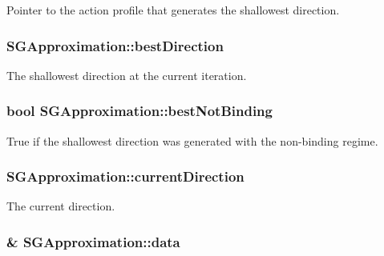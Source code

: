 Pointer to the action profile that generates the shallowest direction. \hypertarget{classSGApproximation_a1dd4f78e0789e61ee5c467afc403fc6d}{
\subsubsection[{best\-Direction}]{ S\-G\-Approximation\-::best\-Direction\hspace{0.3cm}{\ttfamily [private]}}}\label{classSGApproximation_a1dd4f78e0789e61ee5c467afc403fc6d}
The shallowest direction at the current iteration. \hypertarget{classSGApproximation_a3f55b0a9fb9f8e2c3ae6949bc8fd046c}{
\subsubsection[{best\-Not\-Binding}]{\setlength{\rightskip}{0pt plus 5cm}bool S\-G\-Approximation\-::best\-Not\-Binding\hspace{0.3cm}{\ttfamily [private]}}}\label{classSGApproximation_a3f55b0a9fb9f8e2c3ae6949bc8fd046c}
True if the shallowest direction was generated with the non-\/binding regime. \hypertarget{classSGApproximation_a603408048cb6c1a13078c27a017e8202}{
\subsubsection[{current\-Direction}]{ S\-G\-Approximation\-::current\-Direction\hspace{0.3cm}{\ttfamily [private]}}}\label{classSGApproximation_a603408048cb6c1a13078c27a017e8202}
The current direction. \hypertarget{classSGApproximation_a5b38e362e6520eeb30f1bd446e2fb70e}{
\subsubsection[{data}]{\& S\-G\-Approximation\-::data\hspace{0.3cm}{\ttfamily [private]}}}\label{classSGApproximation_a5b38e362e6520eeb30f1bd446e2fb70e}

